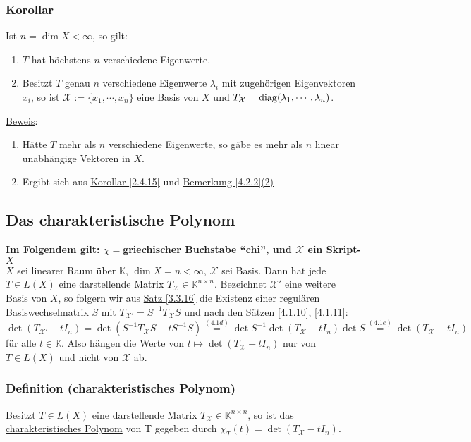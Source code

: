 \subsubsection{Korollar}
Ist $n=\dim X<\infty$, so gilt:
\renewcommand{\labelenumi}{(\alph{enumi})}
\begin{enumerate}
\item $T$ hat höchstens $n$ verschiedene Eigenwerte.
\item Besitzt $T$ genau $n$ verschiedene Eigenwerte $\lambda _i$ mit zugehörigen Eigenvektoren $x_i$, so ist $\mathcal{X}:=\{x_1,\cdots ,x_n\}$ eine Basis von $X$ und $T_\mathcal{X}=\operatorname{diag}(\lambda _1,\cdots ,\lambda _n)$.
\end{enumerate}
\underline{Beweis}:
\begin{enumerate}
\item Hätte $T$ mehr als $n$ verschiedene Eigenwerte, so gäbe es mehr als $n$ linear unabhängige Vektoren in $X$.
\item Ergibt sich aus \hyperref[2.4.15]{Korollar \ref{2.4.15}} und \hyperref[4.2.2]{Bemerkung \ref{4.2.2}(2)}
\end{enumerate}
\subsection{Das charakteristische Polynom}
\textbf{Im Folgendem gilt: $\chi =$griechischer Buchstabe "`chi"', und $\mathcal{X}$ ein Skript-$X$\\}
$X$ sei linearer Raum über $\mathbb{K}$, $\dim X=n<\infty$, $\mathcal{X}$ sei Basis.  Dann hat jede $T\in L(X)$ eine darstellende Matrix $T_\mathcal{X}\in \mathbb{K}^{n\times n}$.  Bezeichnet $\mathcal{X}'$ eine weitere Basis von $X$, so folgern wir aus \hyperref[3.3.16]{Satz \ref{3.3.16}} die Existenz einer regulären Basiswechselmatrix $S$ mit $T_{\mathcal{X}'}=S^{-1}T_\mathcal{X}S$ und nach den Sätzen \hyperref[4.1.10]{\ref{4.1.10}}, \hyperref[4.1.11]{\ref{4.1.11}}:
\[\det (T_{\mathcal{X}'}-tI_n)=\det (S^{-1}T_\mathcal{X}S-tS^{-1}S)\stackrel{\hyperref[4.1d]{(4.1d)}}{=}\det S^{-1}\det (T_\mathcal{X}-tI_n)\det S\stackrel{\hyperref[4.1e]{(4.1e)}}{=}\det (T_\mathcal{X}-tI_n)\]
für alle $t\in \mathbb{K}$.  Also hängen die Werte von $t\mapsto \det (T_\mathcal{X}-tI_n)$ nur von $T\in L(X)$ und nicht von $\mathcal{X}$ ab.
\subsubsection{Definition (charakteristisches Polynom)}
Besitzt $T\in L(X)$ eine darstellende Matrix $T_\mathcal{X}\in\mathbb{K}^{n\times n}$, so ist das \underline{charakteristisches Polynom} von T gegeben durch $\chi _T(t)=\det (T_\mathcal{X}-tI_n)$.

